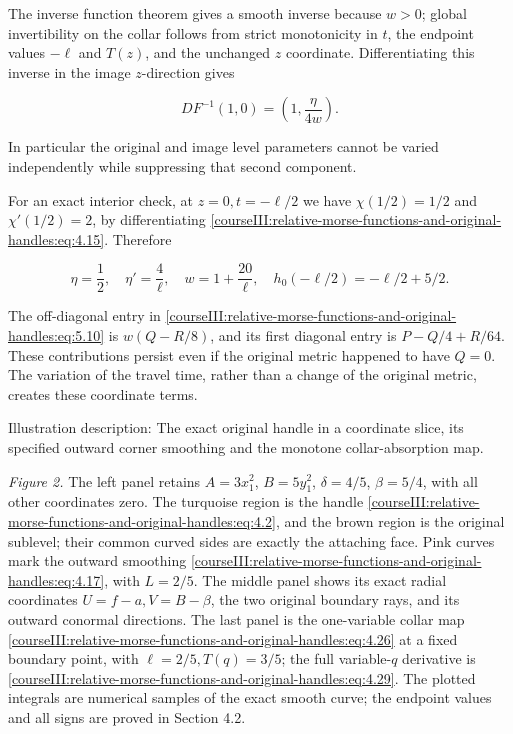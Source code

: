 The inverse function theorem gives a smooth inverse because \(w>0\); global invertibility on the collar follows from strict monotonicity in \(t\), the endpoint values \(-\ell\) and \(T(z)\), and the unchanged \(z\) coordinate. Differentiating this inverse in the image \(z\)-direction gives

\begin{equation}
DF^{-1}(1,0)=\left(1,\frac{\eta}{4w}\right).
\label{courseIII:relative-morse-functions-and-original-handles:eq:5.11}
\end{equation}

In particular the original and image level parameters cannot be varied independently while suppressing that second component.

For an exact interior check, at \(z=0,t=-\ell/2\) we have \(\chi(1/2)=1/2\) and \(\chi'(1/2)=2\), by differentiating \eqref{courseIII:relative-morse-functions-and-original-handles:eq:4.15}. Therefore

\begin{equation}
\eta=\frac12,\quad \eta'=\frac4\ell,\quad
w=1+\frac{20}{\ell},\quad
h_0(-\ell/2)=-\ell/2+5/2.
\label{courseIII:relative-morse-functions-and-original-handles:eq:5.12}
\end{equation}

The off-diagonal entry in \eqref{courseIII:relative-morse-functions-and-original-handles:eq:5.10} is \(w(Q-R/8)\), and its first diagonal entry is \(P-Q/4+R/64\). These contributions persist even if the original metric happened to have \(Q=0\). The variation of the travel time, rather than a change of the original metric, creates these coordinate terms.

Illustration description: The exact original handle in a coordinate slice, its specified outward corner smoothing and the monotone collar-absorption map.

\emph{Figure 2.} The left panel retains \(A=3x_1^2\), \(B=5y_1^2\), \(\delta=4/5\), \(\beta=5/4\), with all other coordinates zero. The turquoise region is the handle \eqref{courseIII:relative-morse-functions-and-original-handles:eq:4.2}, and the brown region is the original sublevel; their common curved sides are exactly the attaching face. Pink curves mark the outward smoothing \eqref{courseIII:relative-morse-functions-and-original-handles:eq:4.17}, with \(L=2/5\). The middle panel shows its exact radial coordinates \(U=f-a,V=B-\beta\), the two original boundary rays, and its outward conormal directions. The last panel is the one-variable collar map \eqref{courseIII:relative-morse-functions-and-original-handles:eq:4.26} at a fixed boundary point, with \(\ell=2/5,T(q)=3/5\); the full variable-\(q\) derivative is \eqref{courseIII:relative-morse-functions-and-original-handles:eq:4.29}. The plotted integrals are numerical samples of the exact smooth curve; the endpoint values and all signs are proved in Section 4.2.
